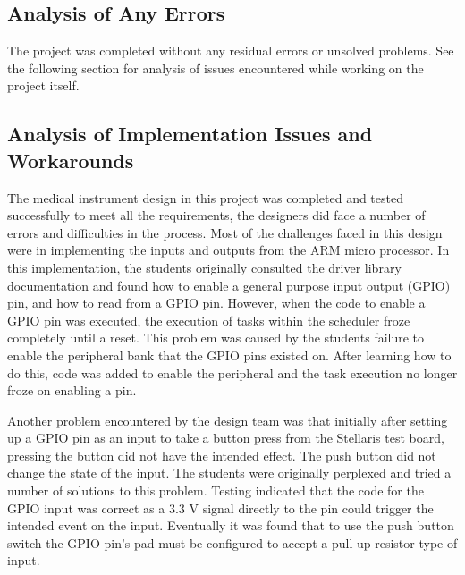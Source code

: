 \documentclass[12pt]{article} %
\begin{document}
\subsection{Analysis of Any Errors}
The project was completed without any residual errors or unsolved problems. See the following section for analysis of issues encountered while working on the project itself.

\subsection{Analysis of Implementation Issues and Workarounds}



The medical instrument design in this project was completed and tested successfully to meet all the requirements, the designers did face a number of errors and difficulties in the process. Most of the challenges faced in this design were in implementing the inputs and outputs from the ARM micro processor. In this implementation, the students originally consulted the driver library documentation and found how to enable a general purpose input output (GPIO) pin, and how to read from a GPIO pin. However, when the code to enable a GPIO pin was executed, the execution of tasks within the scheduler froze completely until a reset. This problem was caused by the students failure to enable the peripheral bank that the GPIO pins existed on. After learning how to do this, code was added to enable the peripheral and the task execution no longer froze on enabling a pin.

Another problem encountered by the design team was that initially after setting up a GPIO pin as an input to take a button press from the Stellaris test board, pressing the button did not have the intended effect. The push button did not change the state of the input. The students were originally perplexed and tried a number of solutions to this problem. Testing indicated that the code for the GPIO input was correct as a 3.3 V signal directly to the pin could trigger the intended event on the input. Eventually it was found that to use the push button switch the GPIO pin's pad must be configured to accept a pull up resistor type of input.
\end{document}
